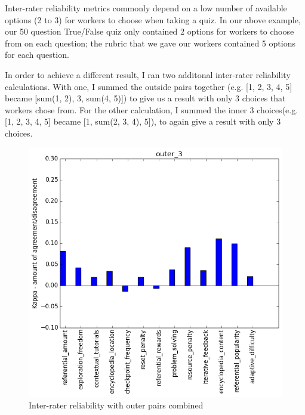 				Inter-rater reliability metrics commonly depend on a low number of available options (2 to 3) for workers to choose when taking a quiz. In our above example, our 50 question True/False quiz only contained 2 options for workers to choose from on each question; the rubric that we gave our workers contained 5 options for each question.

				In order to achieve a different result, I ran two additonal inter-rater reliability calculations. With one, I summed the outside pairs together (e.g. [1, 2, 3, 4, 5] became [sum(1, 2), 3, sum(4, 5)]) to give us a result with only 3 choices that workers chose from. For the other calculation, I summed the inner 3 choices(e.g. [1, 2, 3, 4, 5] became [1, sum(2, 3, 4), 5]), to again give a result with only 3 choices.

				\begin{figure}[] 
					\centering 
					\includegraphics[width=\textwidth, height=.4\textheight, keepaspectratio=true]{outer_3_stats.png} 
					\caption{Inter-rater reliability with outer pairs combined}
				\end{figure}
